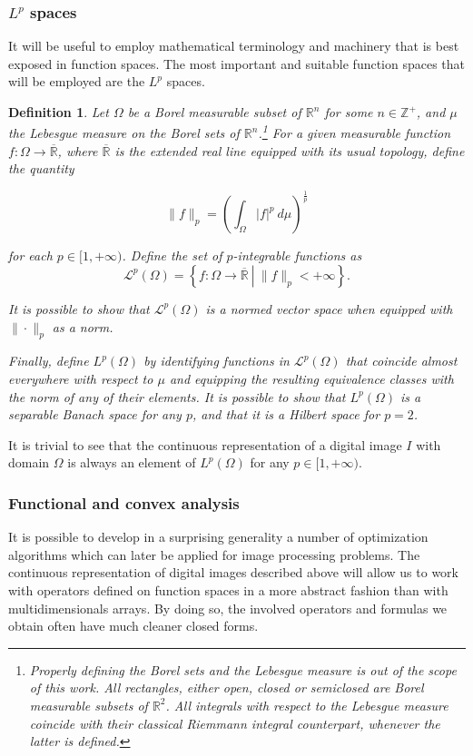 \documentclass[twocolumn,twoside,a4paper,10pt]{IEEEtran}
\newtheorem{definition}{Definition}
\begin{document}
\subsubsection{\(L^p\) spaces}
It will be useful to employ mathematical terminology and machinery that is best exposed in function spaces. The most important and suitable function spaces that will be employed are the \(L^p\) spaces.

\begin{definition}
  Let \(\Omega\) be a Borel measurable subset of \(\mathbb{R}^n\) for some \(n\in \mathbb{Z}^+\), and \(\mu\) the Lebesgue measure on the Borel sets of \(\mathbb{R}^n\).\footnote{Properly defining the Borel sets and the Lebesgue measure is out of the scope of this work. All rectangles, either open, closed or semiclosed are Borel measurable subsets of \(\mathbb{R}^2\). All integrals with respect to the Lebesgue measure coincide with their classical Riemmann integral counterpart, whenever the latter is defined.} For a given measurable function \(f\colon \Omega\to \overline{\mathbb{R}}\), where \(\overline{\mathbb{R}}\) is the extended real line equipped with its usual topology, define the quantity

  \[
    \|f\|_{p} = \left(\int_{\Omega}|f|^p~d\mu\right)^{\frac 1p}
  \]

  for each \(p\in[1, +\infty)\). Define the set of \(p\)-integrable functions as 
  \[
    \mathcal{L}^p(\Omega) = \left\{f\colon\Omega\to \mathbb{\overline{R}}~\left|~\|f\|_{p}<+\infty\right.\right\}
  .\]

  It is possible to show that \(\mathcal{L}^p(\Omega)\) is a normed vector space when equipped with \(\|\cdot\|_{p}\) as a norm.

  Finally, define \(L^p(\Omega)\) by identifying functions in \(\mathcal{L}^p(\Omega)\) that coincide almost everywhere with respect to \(\mu\) and equipping the resulting equivalence classes with the norm of any of their elements. It is possible to show that \(L^p(\Omega)\) is a separable Banach space for any \(p\), and that it is a Hilbert space for \(p=2\).
\end{definition}

It is trivial to see that the continuous representation of a digital image \(I\) with domain \(\Omega\) is always an element of \(L^p(\Omega)\) for any \(p\in[1, +\infty)\).

\subsubsection{Functional and convex analysis} It is possible to develop in a surprising generality a number of optimization algorithms which can later be applied for image processing problems. The continuous representation of digital images described above will allow us to work with operators defined on function spaces in a more abstract fashion than with multidimensionals arrays. By doing so, the involved operators and formulas we obtain often have much cleaner closed forms.
\end{document}
